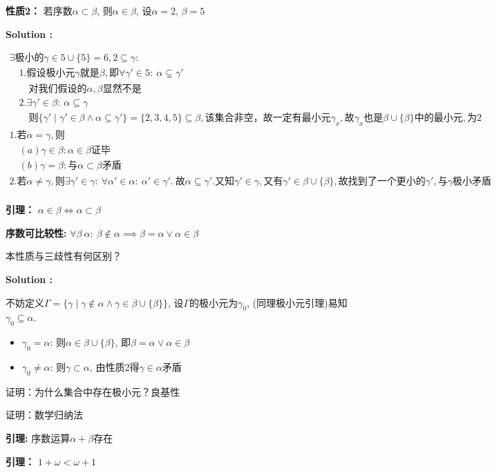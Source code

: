\documentclass[UTF8, 9pt, a4paper]{ctexart}
\newcommand{\ksec}[2]{\noindent \textbf{\large #1} #2\par}
\newcommand{\ksolve}[1]{\noindent\textbf{\large Solution #1: }\par}
\begin{document}
	
	\ksec{性质2：}{若序数$ \alpha \subset \beta$, 则$ \alpha \in \beta $, 设$ \alpha = 2 $, $\beta = 5$}
	\ksolve{}
	$\begin{array}{l}
		\exists \texttt{极小的} \gamma \in 5 \cup \{5\} = 6, 2 \subseteq \gamma :\\
		
 		\quad 1. \texttt{假设极小元}\gamma\texttt{就是}\beta, \texttt{即}\forall \gamma' \in 5:\ \alpha \subsetneq \gamma' \\
 		
 		\qquad  \texttt{对我们假设的}\alpha, \beta\texttt{显然不是}\\
 		
		\quad 2. \exists \gamma' \in \beta:\ \alpha \subseteq \gamma\\
		
		\qquad \texttt{则}\{ \gamma' \mid \gamma' \in \beta \land \alpha \subseteq \gamma' \} = \{ 2, 3, 4, 5 \} \subseteq \beta, \texttt{该集合非空，故一定有最小元}\gamma_x, \texttt{故}\gamma_x\texttt{也是}\beta\cup \{\beta\}\texttt{中的最小元}, \texttt{为}2\\
		
		1. \texttt{若}\alpha=\gamma, \texttt{则}\\
		
		\quad (a) \gamma \in \beta : \alpha \in \beta \texttt{证毕}\\
		\quad (b) \gamma = \beta : \texttt{与}\alpha \subset \beta \texttt{矛盾}\\
		
		2. \texttt{若}\alpha \neq \gamma, \texttt{则}\exists \gamma' \in \gamma:\ \forall \alpha' \in \alpha:\ \alpha' \in \gamma'.\ \texttt{故}\alpha \subseteq \gamma'. \texttt{又知}\gamma' \in \gamma, \texttt{又有}\gamma' \in \beta \cup \{\beta\}, \texttt{故找到了一个更小的}\gamma', \texttt{与} \gamma\texttt{极小矛盾}\\
	\end{array} $\par
	\ksec{引理：}{$ \alpha \in \beta \Longleftrightarrow \alpha \subset \beta$ }
	\vspace{0.5cm}
	
	\ksec{序数可比较性: }{$\forall \beta \ \alpha:\ \beta \notin \alpha \implies \beta = \alpha \lor \alpha \in \beta $}
	本性质与三歧性有何区别？\par
	\ksolve{}
	不妨定义$ \Gamma = \{ \gamma \mid \gamma \notin \alpha \land \gamma \in \beta \cup \{\beta\}\} $, 设$ \Gamma $的极小元为$ \gamma_0 $, (同理极小元引理)易知$ \gamma_0 \subseteq \alpha $.
	\begin{itemize}
		\item $ \gamma_0 = \alpha $: 则$ \alpha \in \beta \cup \{\beta\} $, 即$ \beta = \alpha \lor \alpha \in \beta $
		\item $ \gamma_0 \neq \alpha $: 则$ \gamma \subset \alpha $, 由性质2得$ \gamma \in \alpha $矛盾
		
		
	\end{itemize}
	
	
	
		证明：为什么集合中存在极小元？良基性
	
	证明：数学归纳法
	
	\ksec{引理: }{序数运算$ \alpha + \beta $存在}
	
	
	\ksec{引理：}{$ 1+\omega < \omega + 1$}
	
	
	
	
\end{document}
